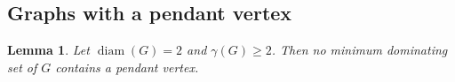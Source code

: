 \documentclass[12pt]{amsart}
\theoremstyle{plain}
\newtheorem{theorem}{Theorem}[section]
\newtheorem{lemma}[theorem]{Lemma}
\theoremstyle{definition}
\begin{document}

\subsection{Graphs with a pendant vertex}


\begin{lemma}\label{Lemma:pendant-not-in-dom}
Let $\operatorname{diam}(G)=2$ and $\gamma(G)\ge 2$. Then no minimum dominating set of $G$ contains a pendant vertex.
\end{lemma}
\end{document}
